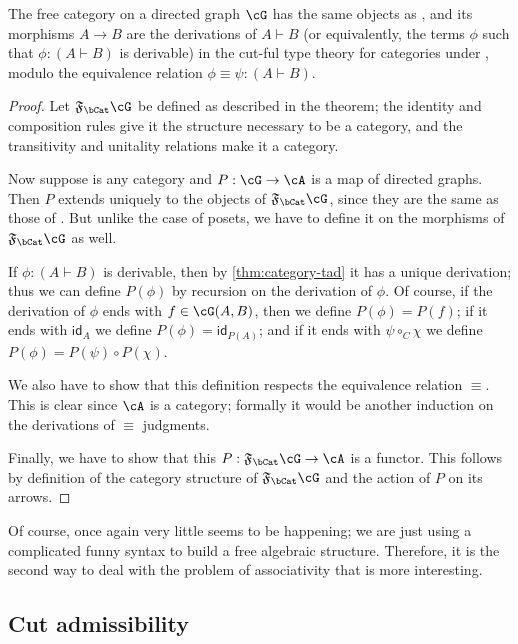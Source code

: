 \documentclass{book}
\def\idfunc{\mathsf{id}}
\let\types\vdash
\newcommand{\F}[1]{\mathfrak{F}_{#1}}
\def\comp#1{\circ_{#1}}
\begin{document}
\begin{thm}\label{thm:category-initial-1}
  The free category on a directed graph $\cG$ has the same objects as \cG, and its morphisms $A\to B$ are the derivations of $A\types B$ (or equivalently, the terms $\phi$ such that $\phi :(A\types B)$ is derivable) in the cut-ful type theory for categories under \cG, modulo the equivalence relation $\phi\equiv \psi:(A\types B)$.
\end{thm}
\begin{proof}
  Let $\F\bCat\cG$ be defined as described in the theorem; the identity and composition rules give it the structure necessary to be a category, and the transitivity and unitality relations make it a category.

  Now suppose \cA is any category and $P:\cG\to\cA$ is a map of directed graphs.
  Then $P$ extends uniquely to the objects of $\F\bCat\cG$, since they are the same as those of \cG.
  But unlike the case of posets, we have to define it on the morphisms of $\F\bCat\cG$ as well.

  If $\phi :(A\types B)$ is derivable, then by \cref{thm:category-tad} it has a unique derivation; thus we can define $P(\phi)$ by recursion on the derivation of $\phi$.
  Of course, if the derivation of $\phi$ ends with $f\in\cG(A,B)$, then we define $P(\phi)=P(f)$; if it ends with $\idfunc_A$ we define $P(\phi)=\idfunc_{P(A)}$; and if it ends with $\psi\comp{C}\chi$ we define $P(\phi) = P(\psi)\circ P(\chi)$.

  We also have to show that this definition respects the equivalence relation $\equiv$.
  This is clear since $\cA$ is a category; formally it would be another induction on the derivations of $\equiv$ judgments.

  Finally, we have to show that this $P:\F\bCat\cG\to\cA$ is a functor.
  This follows by definition of the category structure of $\F\bCat\cG$ and the action of $P$ on its arrows.
\end{proof}

Of course, once again very little seems to be happening; we are just using a complicated funny syntax to build a free algebraic structure.
Therefore, it is the second way to deal with the problem of associativity that is more interesting.

\subsection{Cut admissibility}
\label{sec:category-cutadm}
\end{document}
